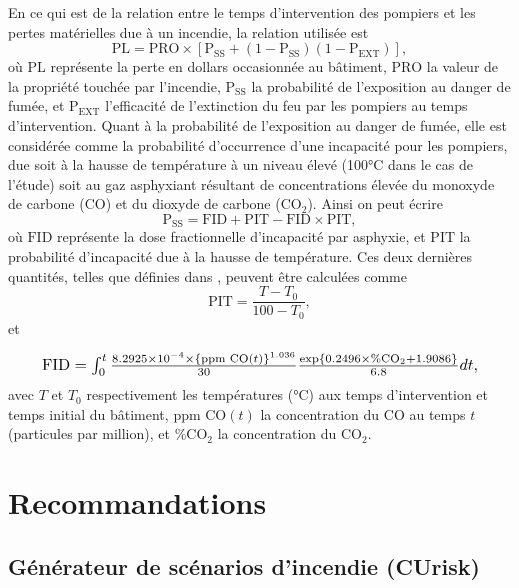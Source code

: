 \documentclass[11pt]{article}
\begin{document}
En ce qui est de la relation entre le temps d'intervention des pompiers et les  pertes matérielles due à un incendie, la relation utilisée est
\begin{equation}
\text{PL} = \text{PRO} \times [\text{P}_{\text{SS}} + (1 - \text{P}_{\text{SS}})(1-\text{P}_{\text{EXT}})],
\end{equation}
où $\text{PL}$ représente la perte en dollars occasionnée au bâtiment, $\text{PRO}$ la valeur de la propriété touchée par l'incendie, $\text{P}_{\text{SS}}$ la probabilité de l'exposition au danger de fumée, et $\text{P}_{\text{EXT}}$ l'efficacité de l'extinction du feu par les pompiers au temps d'intervention. Quant à la probabilité de l'exposition au danger de fumée, elle est considérée comme la probabilité d'occurrence d'une incapacité pour les pompiers, due soit à la hausse de température à un niveau élevé (100°C dans le cas de l'étude) soit au gaz asphyxiant résultant de concentrations élevée du monoxyde de carbone ($\text{CO}$) et du dioxyde de carbone ($\text{CO}_2$). Ainsi on peut écrire
\begin{equation}
\text{P}_{\text{SS}} = \text{FID} + \text{PIT} - \text{FID} \times \text{PIT},
\end{equation}
où $\text{FID}$ représente la dose fractionnelle d'incapacité par asphyxie, et $\text{PIT}$ la probabilité d'incapacité due à la hausse de température. Ces deux dernières quantités, telles que définies dans \cite{hadjisophocleous1992model}, peuvent être calculées comme
\begin{equation}
\text{PIT} = \frac{T - T_0}{100 - T_0},
\end{equation}
et

\begin{equation}
\resizebox{0.93\hsize}{!}{
$\text{FID} = \int_0^t \frac{8.2925 \times 10^{-4} \times \left\lbrace \text{ppm CO}(t) \right\rbrace^{1.036}}{30} \frac{\text{exp}\{0.2496 \times \% \text{CO}_2 + 1.9086 \}}{6.8}dt,$
}
\end{equation}
avec $T$ et $T_0$ respectivement les températures (°C) aux temps d'intervention et temps initial du bâtiment, $\text{ppm CO}(t)$ la concentration du $\text{CO}$ au temps $t$ (particules par million), et $\% \text{CO}_2$ la concentration du $\text{CO}_2$.


\section{Recommandations}

\subsection{Générateur de scénarios d'incendie (CUrisk)}
\end{document}
